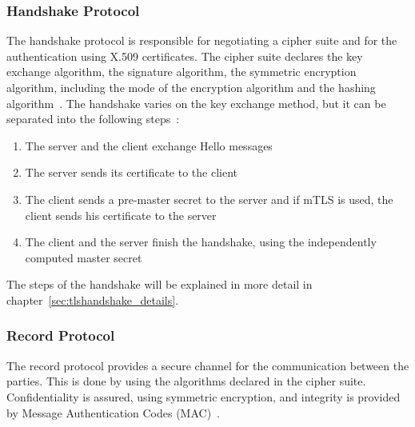 \subsubsection{Handshake Protocol}
The handshake protocol is responsible for negotiating a cipher suite and for the authentication using X.509 certificates.
The cipher suite declares the key exchange algorithm, the signature algorithm, the symmetric encryption algorithm, including the mode of the encryption algorithm and the hashing algorithm~\cite{turnertls, kurbatov2021design}.
The handshake varies on the key exchange method, but it can be separated into the following steps~\cite{krawczyk2013security}:
\begin{enumerate}
    \item The server and the client exchange Hello messages
    \item The server sends its certificate to the client
    \item The client sends a pre-master secret to the server and if mTLS is used, the client sends his certificate to the server
    \item The client and the server finish the handshake, using the independently computed master secret
\end{enumerate}
The steps of the handshake will be explained in more detail in chapter~\ref{sec:tlshandshake_details}.

\subsubsection{Record Protocol}
The record protocol provides a secure channel for the communication between the parties.
This is done by using the algorithms declared in the cipher suite.
Confidentiality is assured, using symmetric encryption, and integrity is provided by Message Authentication Codes (MAC)~\cite{kurbatov2021design, krawczyk2013security}.

